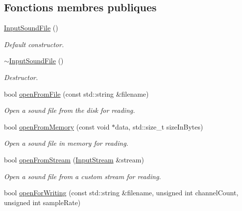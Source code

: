 \subsection*{Fonctions membres publiques}
\begin{DoxyCompactItemize}
\item 
\mbox{\label{classsf_1_1InputSoundFile_a3b95347de25d1d93a3230287cf47a077}} 
\hyperlink{classsf_1_1InputSoundFile_a3b95347de25d1d93a3230287cf47a077}{Input\+Sound\+File} ()
\begin{DoxyCompactList}\small\item\em Default constructor. \end{DoxyCompactList}\item 
\mbox{\label{classsf_1_1InputSoundFile_a326a1a486587038123de0c187bf5c635}} 
\hyperlink{classsf_1_1InputSoundFile_a326a1a486587038123de0c187bf5c635}{$\sim$\+Input\+Sound\+File} ()
\begin{DoxyCompactList}\small\item\em Destructor. \end{DoxyCompactList}\item 
bool \hyperlink{classsf_1_1InputSoundFile_af68e54bc9bfac19554c84601156fe93f}{open\+From\+File} (const std\+::string \&filename)
\begin{DoxyCompactList}\small\item\em Open a sound file from the disk for reading. \end{DoxyCompactList}\item 
bool \hyperlink{classsf_1_1InputSoundFile_a4e034a8e9e69ca3c33a3f11180250400}{open\+From\+Memory} (const void $\ast$data, std\+::size\+\_\+t size\+In\+Bytes)
\begin{DoxyCompactList}\small\item\em Open a sound file in memory for reading. \end{DoxyCompactList}\item 
bool \hyperlink{classsf_1_1InputSoundFile_a32b76497aeb088a2b46dc6efd819b909}{open\+From\+Stream} (\hyperlink{classsf_1_1InputStream}{Input\+Stream} \&stream)
\begin{DoxyCompactList}\small\item\em Open a sound file from a custom stream for reading. \end{DoxyCompactList}\item 
bool \hyperlink{classsf_1_1InputSoundFile_a84f32fdf5fa619538506395c3c5a030a}{open\+For\+Writing} (const std\+::string \&filename, unsigned int channel\+Count, unsigned int sample\+Rate)

\end{DoxyCompactItemize}
